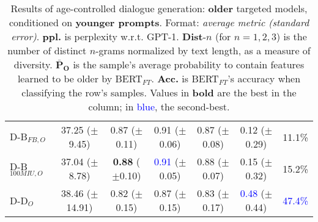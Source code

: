 \begin{table*}[h!]
{\begin{tabular}{l | c c c c | c c}
    \midrule
    D-B$_{FB, O}$ & 37.25 ($\pm$9.45) & 0.87 ($\pm$0.11) & 0.91 ($\pm$0.06) & 0.87 ($\pm$0.08) & 0.12 ($\pm$0.29) & 11.1\%\\
    D-B$_{100MIU, O}$ & 37.04 ($\pm$8.78) & \textbf{0.88} ($\pm$0.10) & \textcolor{blue}{0.91} ($\pm$0.05) & 0.88 ($\pm$0.07) & 0.15 ($\pm$0.32) & 15.2\%\\
    \midrule
    D-D$_{O}$ & 38.46 ($\pm$14.91) & 0.82 ($\pm$0.15) & 0.87 ($\pm$0.15) & 0.83 ($\pm$0.17) & \textcolor{blue}{0.48} ($\pm$0.44) & \textcolor{blue}{47.4\%}\\
    \bottomrule
    \end{tabular}
    }
    \caption{Results of age-controlled dialogue generation: \textbf{older} targeted models, conditioned on \textbf{younger prompts}. Format: \textit{average metric (standard error)}. \textbf{ppl.} is perplexity w.r.t. GPT-1. \textbf{Dist}-$n$ (for $n = 1, 2, 3$) is the number of distinct $n$-grams normalized by text length, as a measure of diversity. $\boldsymbol{\bar{P}_O}$ is the sample's average probability to contain features learned to be older by BERT$_{FT}$. \textbf{Acc.} is BERT$_{FT}$'s accuracy when classifying the row's samples. Values in \textbf{bold} are the best in the column; in \textcolor{blue}{blue}, the second-best.}
    \label{tab:ctg_results_ws_young_prompt_old_model}
\end{table*}

